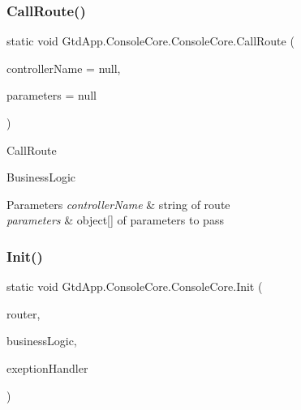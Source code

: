 \subsubsection{\texorpdfstring{Call\+Route()}{CallRoute()}}
{\footnotesize\ttfamily static void Gtd\+App.\+Console\+Core.\+Console\+Core.\+Call\+Route (\begin{DoxyParamCaption}\item[{string}]{controller\+Name = {\ttfamily null},  }\item[{object \mbox{[}$\,$\mbox{]}}]{parameters = {\ttfamily null} }\end{DoxyParamCaption})\hspace{0.3cm}{\ttfamily [static]}}



Call\+Route 

Business\+Logic


\begin{DoxyParams}{Parameters}
{\em controller\+Name} & string of route\\
\hline
{\em parameters} & object\mbox{[}\mbox{]} of parameters to pass\\
\hline
\end{DoxyParams}
\mbox{\label{class_gtd_app_1_1_console_core_1_1_console_core_afa9970b483de386eae4051ce5ee5ccc1}} 
\subsubsection{\texorpdfstring{Init()}{Init()}}
{\footnotesize\ttfamily static void Gtd\+App.\+Console\+Core.\+Console\+Core.\+Init (\begin{DoxyParamCaption}\item[{\mbox{\hyperlink{class_gtd_app_1_1_logic_1_1_routing_1_1_router}{Router}}}]{router,  }\item[{\mbox{\hyperlink{class_gtd_app_1_1_logic_1_1_business_logic}{Business\+Logic}}}]{business\+Logic,  }\item[{\mbox{\hyperlink{interface_gtd_app_1_1_console_core_1_1_interfaces_1_1_i_exception_handler}{I\+Exception\+Handler}}}]{exeption\+Handler }\end{DoxyParamCaption})\hspace{0.3cm}{\ttfamily [static]}}



